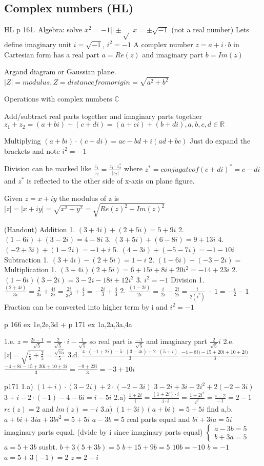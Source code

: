 \subsection{Complex numbers (HL)}
HL p 161.
Algebra: solve $x^2=-1 || \pm\sqrt{}$
$x=\pm\sqrt{-1}$ (not a real number)
Lets define imaginary unit $i=\sqrt{-1}$, $i^2=-1$
A complex number $z=a+i\cdot b$ in Cartesian form has a real part $a=Re(z)$
and imaginary part $b=Im(z)$

Argand diagram or Gaussian plane.
$|Z|=modulus, Z=distance from origin=\sqrt{a^2+b^2}$

Operations with complex numbers $\mathbb{C}$

Add/subtract real parts together and imaginary parts together $z_1+z_2=(a+bi)+(c+di)=(a+ci)+(b+di), a,b,c,d\in\mathbb{R}$

Multiplying $(a+bi)\cdot (c+di)=ac-bd+i(ad+bc)$
Just do expand the brackets and note $i^2=-1$

Division can be marked like $\frac{z_1}{z_2}=\frac{z_1\cdot z_2^*}{|z_2|}$
where $z^*=conjugate of (c+di)^*=c-di$
and $z^*$ is reflected to the other side of x-axis on plane figure.

Given $z=x+iy$ the modulus of z is $|z|=|x+iy|=\sqrt{x^2+y^2}=\sqrt{Re(z)^2+Im(z)^2}$

(Handout)
Addition
1. $(3+4i)+(2+5i)=5+9i$
2. $(1-6i)+(3-2i)=4-8i$
3. $(3+5i)+(6-8i)=9+13i$
4. $(-2+3i)+(1-2i)=-1+i$
5. $(4-3i)+(-5-7i)=-1-10i$
Subtraction
1. $(3+4i)-(2+5i)=1-i$
2. $(1-6i)-(-3-2i)=$
Multiplication
1. $(3+4i)(2+5i)=6+15i+8i+20i^2=-14+23i$
2. $(1-6i)(3-2i)=3-2i-18i+12i^2$
3. $i^2=-1$
Division
1. $\frac{(2+4i)}{3i}=\frac{2}{3i}+\frac{4i}{3i}=\frac{2i}{3i^2}+\frac{4}{3}=-\frac{2i}{3}+\frac{4}{3}$
2. $\frac{(1-2i)}{2i}=\frac{i}{2i}-\frac{2i}{2i}=\frac{i}{2(i^2)}-1=-\frac{i}{2}-1$
Fraction can be converted into higher term by i and $i^2=-1$

p 166 ex 1e,2e,3d + p 171 ex 1a,2a,3a,4a

1.e. 
$z=\frac{2i-1}{\sqrt{5}}=\frac{2}{\sqrt{5}}\cdot i-\frac{1}{\sqrt{5}}$
so real part is $\frac{-1}{\sqrt{5}}$ and imaginary part $\frac{2}{\sqrt{5}}i$
2.e.
$|z|=\sqrt{\frac{1}{5}+\frac{2}{5}}=\frac{\sqrt{15}}{5}$
3.d. $\frac{4\cdot(-1+2i)-5\cdot(3-4i)+2\cdot(5+i)}{3}$
$\frac{-4+8i)-15+20i+10+2i)}{3}$
$\frac{-4+8i-15+20i+10+2i}{3}=\frac{-9+22i}{3}=-3+10i$

p171
1.a) $(1+i)\cdot (3-2i)+2\cdot(-2-3i)$
$3-2i+3i-2i^2+2(-2-3i)$
$3+i-2\cdot(-1)-4-6i=i-5i$
2.a) $\frac{1+2i}{i}=\frac{(1+2i)\cdot i}{i\cdot i}=\frac{1+2i^2}{i^2}=\frac{i-2}{-1}=2-1$
$re(z)=2$ and $lm(z)=-i$
3.a) $(1+3i)(a+bi)=5+5i$ find a,b.
$a+bi+3ia+3bi^2=5+5i$
$a-3b=5$ real parts equal
and $bi+3ia=5i$ imaginary parts equal. (dvide by i since imaginary parts equal)
$\begin{cases}a-3b=5\\ b+3a=5\end{cases}$
$a=5+3b$ susbt.
$b+3(5+3b)=5$
$b+15+9b=5$
$10b=-10$
$b=-1$
$a=5+3(-1)=2$
$z=2-i$
